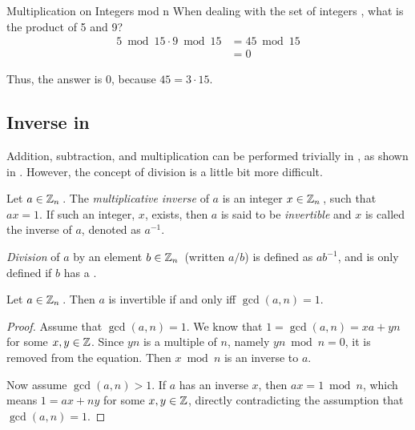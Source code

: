 \begin{example}[]{Multiplication on Integers mod n}
  When dealing with the set of integers , what is the product of 5 and 9?
  \tcblower{}
  \begin{align*}
    5 \bmod 15 \cdot 9 \bmod 15 &= 45 \bmod 15 \\
                                &= 0
  \end{align*}

  Thus, the answer is 0, because $45 = 3 \cdot 15$.
\end{example}

\subsection{\texorpdfstring{Inverse in \TextIntsModN{}}{Inverse in Integers Modulo n}}\label{subsec:Inverse_Z_mod_n}
Addition, subtraction, and multiplication can be performed trivially in \TextIntsModN{}, as shown in .
However, the concept of division is a little bit more difficult.
\begin{definition}\label{def:Multiplicative_Inverse}
  Let $a \in \operatorname{\mathbb{Z}}_{n}{}$.
  The \emph{multiplicative inverse} of $a$ is an integer $x \in \operatorname{\mathbb{Z}}_{n}{}$, such that $ax = 1$.
  If such an integer, $x$, exists, then $a$ is said to be \emph{invertible} and $x$ is called the inverse of $a$, denoted as $a^{-1}$.
\end{definition}

\begin{definition}\label{def:Division_Z_mod_n}
  \emph{Division} of $a$ by an element $b \in \operatorname{\mathbb{Z}}_{n}{}$ (written $a/b$) is defined as $ab^{-1}$, and is only defined if $b$ has a .
\end{definition}

\begin{lemma}
  Let $a \in \operatorname{\mathbb{Z}}_{n}{}$.
  Then $a$ is invertible if and only iff $\gcd(a, n) = 1$.
\end{lemma}

\begin{proof}
  Assume that $\gcd(a, n) = 1$.
  We know that $1 = \gcd(a, n) = xa + yn$ for some $x, y \in \operatorname{\mathbb{Z}}$.
  Since $yn$ is a multiple of $n$, namely $yn \bmod n = 0$, it is removed from the equation.
  Then $x \bmod n$ is an inverse to $a$.

  Now assume $\gcd(a, n) > 1$.
  If $a$ has an inverse $x$, then $ax = 1 \bmod n$, which means $1 = ax + ny$ for some $x, y \in \operatorname{\mathbb{Z}}$, directly contradicting the assumption that $\gcd(a, n) = 1$.
\end{proof}

